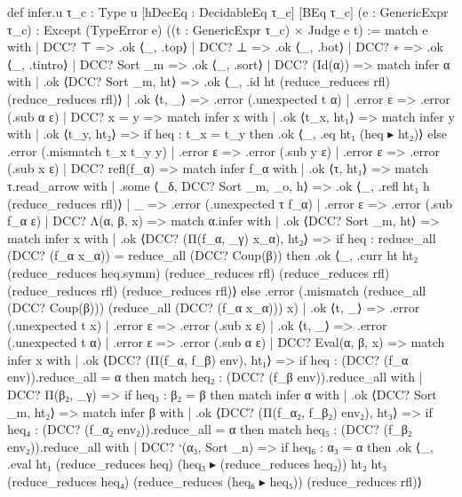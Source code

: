 \documentclass{article}
\begin{document}
\begin{leancode}
def infer.{u} {τ_c : Type u} [hDecEq : DecidableEq τ_c] [BEq τ_c] (e : GenericExpr τ_c) : Except (TypeError e) ((t : GenericExpr τ_c) × Judge e t) :=
  match e with
  | DCC? ⊤ => .ok ⟨_, .top⟩
  | DCC? ⊥ => .ok ⟨_, .bot⟩
  | DCC? ∗ => .ok ⟨_, .tintro⟩
  | DCC? Sort _m => .ok ⟨_, .sort⟩
  | DCC? (Id(α)) =>
    match infer α with
    | .ok ⟨DCC? Sort _m, ht⟩ => .ok ⟨_, .id ht (reduce_reduces rfl) (reduce_reduces rfl)⟩
    | .ok ⟨t, _⟩ => .error (.unexpected t α)
    | .error ε => .error (.sub α ε)
  | DCC? x = y =>
    match infer x with
    | .ok ⟨t_x, ht₁⟩ =>
      match infer y with
      | .ok ⟨t_y, ht₂⟩ =>
        if heq : t_x = t_y then
          .ok ⟨_, .eq ht₁ (heq ▸ ht₂)⟩
        else .error (.mismatch t_x t_y y)
      | .error ε => .error (.sub y ε)
    | .error ε => .error (.sub x ε)
  | DCC? refl(f_α) =>
    match infer f_α with
    | .ok ⟨τ, ht₁⟩ =>
      match τ.read_arrow with
      | .some ⟨_δ, DCC? Sort _m, _o, h⟩ =>
        .ok ⟨_, .refl ht₁ h (reduce_reduces rfl)⟩
      | _ => .error (.unexpected τ f_α)
    | .error ε => .error (.sub f_α ε)
  | DCC? Λ(α, β, x) =>
    match α.infer with
    | .ok ⟨DCC? Sort _m, ht⟩ =>
      match infer x with
      | .ok ⟨DCC? (Π(f_α, _γ) x_α), ht₂⟩ =>
        if heq : reduce_all (DCC? (f_α x_α)) = reduce_all (DCC? Coup(β)) then
          .ok ⟨_, .curr
            ht
            ht₂
            (reduce_reduces heq.symm)
            (reduce_reduces rfl)
            (reduce_reduces rfl)
            (reduce_reduces rfl)
            (reduce_reduces rfl)⟩
        else .error (.mismatch (reduce_all (DCC? Coup(β))) (reduce_all (DCC? (f_α x_α))) x)
      | .ok ⟨t, _⟩ => .error (.unexpected t x)
      | .error ε => .error (.sub x ε)
    | .ok ⟨t, _⟩ => .error (.unexpected t α)
    | .error ε => .error (.sub α ε)
  | DCC? Eval(α, β, x) =>
    match infer x with
    | .ok ⟨DCC? (Π(f_α, f_β) env), ht₁⟩ =>
      if heq : (DCC? (f_α env)).reduce_all = α then
        match heq₂ : (DCC? (f_β env)).reduce_all with
        | DCC? Π(β₂, _γ) =>
          if heq₃ : β₂ = β then
            match infer α with
            | .ok ⟨DCC? Sort _m, ht₂⟩ =>
              match infer β with
              | .ok ⟨DCC? (Π(f_α₂, f_β₂) env₂), ht₃⟩ =>
                if heq₄ : (DCC? (f_α₂ env₂)).reduce_all = α then
                  match heq₅ : (DCC? (f_β₂ env₂)).reduce_all with
                  | DCC? `(α₃, Sort _n) =>
                    if heq₆ : α₃ = α then
                      .ok ⟨_, .eval ht₁ (reduce_reduces heq) (heq₃ ▸ (reduce_reduces heq₂))
                        ht₂ ht₃ (reduce_reduces heq₄) (reduce_reduces (heq₆ ▸ heq₅)) (reduce_reduces rfl)⟩

\end{leancode}
\end{document}
